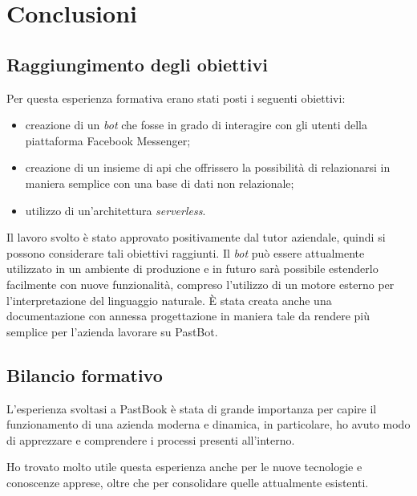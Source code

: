 
\chapter{Conclusioni}

\section{Raggiungimento degli obiettivi}

Per questa esperienza formativa erano stati posti i seguenti obiettivi:
\begin{itemize}
  \item creazione di un \textit{bot} che fosse in grado di interagire con gli
utenti della piattaforma Facebook Messenger;
  \item creazione di un insieme di \gls{api} che offrissero la possibilità di
relazionarsi in maniera semplice con una base di dati non relazionale;
  \item utilizzo di un'architettura \textit{serverless}.
\end{itemize}

Il lavoro svolto è stato approvato positivamente dal tutor aziendale, quindi si
possono considerare tali obiettivi raggiunti.
Il \textit{bot} può essere attualmente utilizzato in un ambiente di produzione e
in futuro sarà possibile estenderlo facilmente con nuove funzionalità, compreso
l'utilizzo di un motore esterno per l'interpretazione del linguaggio naturale.
È stata creata anche una documentazione con annessa progettazione in maniera
tale da rendere più semplice per l'azienda lavorare su PastBot.

\section{Bilancio formativo}

L'esperienza svoltasi a PastBook è stata di grande importanza per capire il
funzionamento di una azienda moderna e dinamica, in particolare, ho avuto modo
di apprezzare e comprendere i processi presenti all'interno.


Ho trovato molto utile questa esperienza anche per le nuove tecnologie e
conoscenze apprese, oltre che per consolidare quelle attualmente esistenti.
